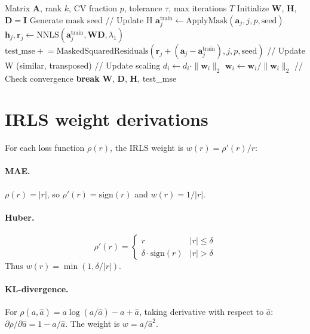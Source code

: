 \documentclass[11pt]{article}
\begin{document}
\begin{algorithm}[h]
\caption{NMF with cross-validation}
\label{alg:nmf_full}
\begin{algorithmic}[1]
\Require Matrix $\mathbf{A}$, rank $k$, CV fraction $p$, tolerance $\tau$, 
max iterations $T$
\State Initialize $\mathbf{W}$, $\mathbf{H}$, $\mathbf{D} = \mathbf{I}$
\State Generate mask seed
  \State // Update H
    \State $\mathbf{a}_j^{\text{train}} \leftarrow \text{ApplyMask}(\mathbf{a}_j, j, p, \text{seed})$
    \State $\mathbf{h}_j, \mathbf{r}_j \leftarrow \text{NNLS}(\mathbf{a}_j^{\text{train}}, 
    \mathbf{WD}, \lambda_1)$
    \State $\text{test\_mse} \mathrel{+}= \text{MaskedSquaredResiduals}(\mathbf{r}_j + 
    (\mathbf{a}_j - \mathbf{a}_j^{\text{train}}), j, p, \text{seed})$
  \EndFor
  \State // Update W (similar, transposed)
  \State // Update scaling
    \State $d_i \leftarrow d_i \cdot \|\mathbf{w}_i\|_2$
    \State $\mathbf{w}_i \leftarrow \mathbf{w}_i / \|\mathbf{w}_i\|_2$
  \EndFor
  \State // Check convergence
    \State \textbf{break}
  \EndIf
\EndFor
\State \Return $\mathbf{W}$, $\mathbf{D}$, $\mathbf{H}$, test\_mse
\end{algorithmic}
\end{algorithm}

\section{IRLS weight derivations} \label{app:irls}

For each loss function $\rho(r)$, the IRLS weight is $w(r) = \rho'(r)/r$:

\paragraph{MAE.} $\rho(r) = |r|$, so $\rho'(r) = \text{sign}(r)$ and 
$w(r) = 1/|r|$.

\paragraph{Huber.} 
\[
\rho'(r) = \begin{cases} r & |r| \leq \delta \\ \delta \cdot \text{sign}(r) & 
|r| > \delta \end{cases}
\]
Thus $w(r) = \min(1, \delta/|r|)$.

\paragraph{KL-divergence.} For $\rho(a, \hat{a}) = a\log(a/\hat{a}) - a + 
\hat{a}$, taking derivative with respect to $\hat{a}$: $\partial\rho/
\partial\hat{a} = 1 - a/\hat{a}$. The weight is $w = a/\hat{a}^2$.
\end{document}
